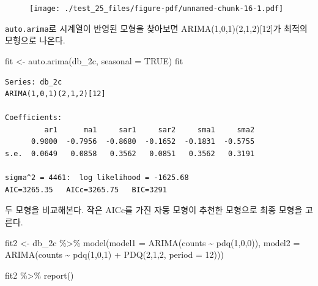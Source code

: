 \documentclass[
  letterpaper,
  DIV=11,
  numbers=noendperiod]{scrreprt}
\newenvironment{Shaded}{\begin{snugshade}}{\end{snugshade}}
\newcommand{\AttributeTok}[1]{\textcolor[rgb]{0.40,0.45,0.13}{#1}}
\newcommand{\ConstantTok}[1]{\textcolor[rgb]{0.56,0.35,0.01}{#1}}
\newcommand{\DecValTok}[1]{\textcolor[rgb]{0.68,0.00,0.00}{#1}}
\newcommand{\FunctionTok}[1]{\textcolor[rgb]{0.28,0.35,0.67}{#1}}
\newcommand{\NormalTok}[1]{\textcolor[rgb]{0.00,0.23,0.31}{#1}}
\newcommand{\OtherTok}[1]{\textcolor[rgb]{0.00,0.23,0.31}{#1}}
\newcommand{\SpecialCharTok}[1]{\textcolor[rgb]{0.37,0.37,0.37}{#1}}
\begin{document}
\begin{figure}[H]

{\centering \texttt{[image: ./test\_25\_files/figure-pdf/unnamed-chunk-16-1.pdf]}

}

\end{figure}

\texttt{auto.arima}로 시계열이 반영된 모형을 찾아보면
ARIMA(1,0,1)(2,1,2){[}12{]}가 최적의 모형으로 나온다.

\begin{Shaded}
\begin{Highlighting}[]
\NormalTok{fit }\OtherTok{\textless{}{-}} \FunctionTok{auto.arima}\NormalTok{(db\_2c, }\AttributeTok{seasonal =} \ConstantTok{TRUE}\NormalTok{)}
\NormalTok{fit}
\end{Highlighting}
\end{Shaded}

\begin{verbatim}
Series: db_2c 
ARIMA(1,0,1)(2,1,2)[12] 

Coefficients:
         ar1      ma1     sar1     sar2     sma1     sma2
      0.9000  -0.7956  -0.8680  -0.1652  -0.1831  -0.5755
s.e.  0.0649   0.0858   0.3562   0.0851   0.3562   0.3191

sigma^2 = 4461:  log likelihood = -1625.68
AIC=3265.35   AICc=3265.75   BIC=3291
\end{verbatim}

두 모형을 비교해본다. 작은 AICc를 가진 자동 모형이 추천한 모형으로 최종
모형을 고른다.

\begin{Shaded}
\begin{Highlighting}[]
\NormalTok{fit2 }\OtherTok{\textless{}{-}}\NormalTok{ db\_2c }\SpecialCharTok{\%\textgreater{}\%}
  \FunctionTok{model}\NormalTok{(}\AttributeTok{model1 =} \FunctionTok{ARIMA}\NormalTok{(counts }\SpecialCharTok{\textasciitilde{}} \FunctionTok{pdq}\NormalTok{(}\DecValTok{1}\NormalTok{,}\DecValTok{0}\NormalTok{,}\DecValTok{0}\NormalTok{)),}
        \AttributeTok{model2 =} \FunctionTok{ARIMA}\NormalTok{(counts }\SpecialCharTok{\textasciitilde{}} \FunctionTok{pdq}\NormalTok{(}\DecValTok{1}\NormalTok{,}\DecValTok{0}\NormalTok{,}\DecValTok{1}\NormalTok{) }\SpecialCharTok{+} \FunctionTok{PDQ}\NormalTok{(}\DecValTok{2}\NormalTok{,}\DecValTok{1}\NormalTok{,}\DecValTok{2}\NormalTok{, }\AttributeTok{period =} \DecValTok{12}\NormalTok{)))}

\NormalTok{fit2 }\SpecialCharTok{\%\textgreater{}\%} \FunctionTok{report}\NormalTok{()}
\end{Highlighting}
\end{Shaded}
\end{document}
